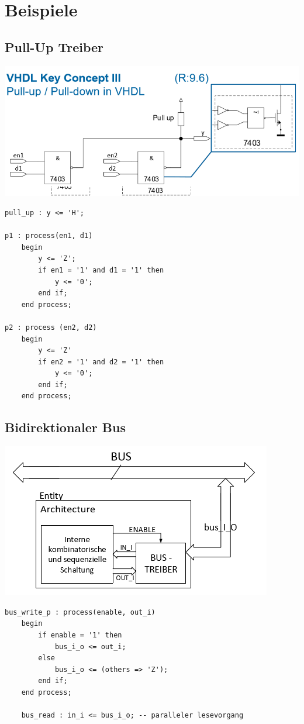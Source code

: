 \section{Beispiele}
\subsection{Pull-Up Treiber}
\includegraphics[width=\columnwidth]{Images/pullup}
\begin{lstlisting}
pull_up : y <= 'H';

p1 : process(en1, d1)
	begin
		y <= 'Z';
		if en1 = '1' and d1 = '1' then
			y <= '0';
		end if;
	end process;
	
p2 : process (en2, d2)
	begin
		y <= 'Z'
		if en2 = '1' and d2 = '1' then
			y <= '0';
		end if;
	end process;
\end{lstlisting}

\subsection{Bidirektionaler Bus}
\begin{center}
	\includegraphics[width=0.8\columnwidth]{Images/bus}
\end{center}
\begin{lstlisting}
bus_write_p : process(enable, out_i)
	begin
		if enable = '1' then
			bus_i_o <= out_i;
		else
			bus_i_o <= (others => 'Z');
		end if;
	end process;
	
	bus_read : in_i <= bus_i_o; -- paralleler lesevorgang
\end{lstlisting}


